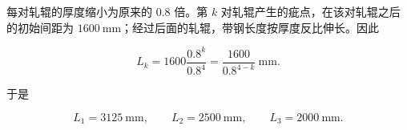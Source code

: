 \begin{answer}

每对轧辊的厚度缩小为原来的 $0.8$ 倍。第 $k$ 对轧辊产生的疵点，在该对轧辊之后的初始间距为 $1600\ \mathrm{mm}$；经过后面的轧辊，带钢长度按厚度反比伸长。因此

\nopagebreak[4]
\[
L_k=1600\frac{0.8^k}{0.8^4}
=\frac{1600}{0.8^{4-k}}\ \mathrm{mm}.
\]

于是

\nopagebreak[4]
\[
L_1=3125\ \mathrm{mm},\qquad
L_2=2500\ \mathrm{mm},\qquad
L_3=2000\ \mathrm{mm}.
\]



\end{answer}
